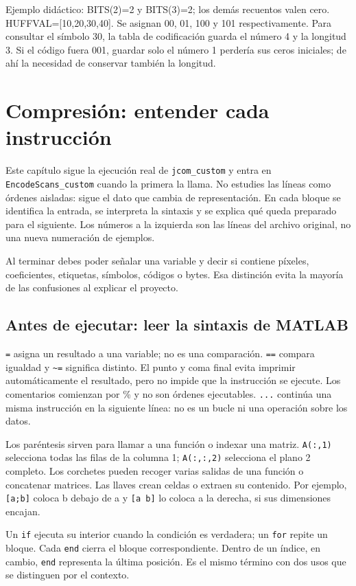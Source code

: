 \documentclass[11pt,a4paper,oneside]{report}
\begin{document}
Ejemplo didáctico: BITS(2)=2 y BITS(3)=2; los demás recuentos valen cero.
HUFFVAL=[10,20,30,40]. Se asignan 00, 01, 100 y 101 respectivamente.
Para consultar el símbolo 30, la tabla de codificación guarda el número 4
y la longitud 3. Si el código fuera 001, guardar solo el número 1 perdería
sus ceros iniciales; de ahí la necesidad de conservar también la longitud.


\chapter{Compresión: entender cada instrucción}

Este capítulo sigue la ejecución real de \texttt{jcom\_custom} y entra
en \texttt{EncodeScans\_custom} cuando la primera la llama. No estudies las
líneas como órdenes aisladas: sigue el dato que cambia de representación.
En cada bloque se identifica la entrada, se interpreta la sintaxis y se explica
qué queda preparado para el siguiente. Los números a la izquierda son las
líneas del archivo original, no una nueva numeración de ejemplos.

Al terminar debes poder señalar una variable y decir si contiene píxeles,
coeficientes, etiquetas, símbolos, códigos o bytes. Esa distinción evita la
mayoría de las confusiones al explicar el proyecto.

\section{Antes de ejecutar: leer la sintaxis de MATLAB}

\texttt{=} asigna un resultado a una variable; no es una comparación.
\texttt{==} compara igualdad y \texttt{\textasciitilde=} significa distinto.
El punto y coma final evita imprimir automáticamente el resultado, pero no
impide que la instrucción se ejecute. Los comentarios comienzan por \% y no
son órdenes ejecutables. \texttt{...} continúa una misma instrucción en la
siguiente línea: no es un bucle ni una operación sobre los datos.

Los paréntesis sirven para llamar a una función o indexar una matriz.
\texttt{A(:,1)} selecciona todas las filas de la columna 1;
\texttt{A(:,:,2)} selecciona el plano 2 completo. Los corchetes pueden
recoger varias salidas de una función o concatenar matrices. Las llaves
crean celdas o extraen su contenido. Por ejemplo, \texttt{[a;b]} coloca b
debajo de a y \texttt{[a b]} lo coloca a la derecha, si sus dimensiones encajan.

Un \texttt{if} ejecuta su interior cuando la condición es verdadera; un
\texttt{for} repite un bloque. Cada \texttt{end} cierra el bloque correspondiente.
Dentro de un índice, en cambio, \texttt{end} representa la última posición.
Es el mismo término con dos usos que se distinguen por el contexto.
\end{document}
